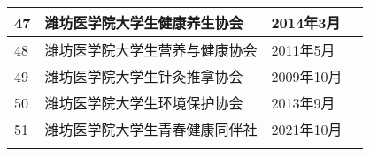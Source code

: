 \begin{center}
\begin{tabular}{|>{\centering\arraybackslash}p{2em}|>{\centering\arraybackslash}p{22em}|%
    >{\centering\arraybackslash}p{6em}|>{\centering\arraybackslash}p{5em}|}
        \cline{1-3}
        47 & 潍坊医学院大学生健康养生协会    & 2014年3月  &                        \\
        \cline{1-3}
        48 & 潍坊医学院大学生营养与健康协会   & 2011年5月  &                        \\
        \cline{1-3}
        49 & 潍坊医学院大学生针灸推拿协会    & 2009年10月 &                        \\
        \cline{1-3}
        50 & 潍坊医学院大学生环境保护协会    & 2013年9月  &                        \\
        \cline{1-3}
        51 & 潍坊医学院大学生青春健康同伴社   & 2021年10月 &                        \\
        \Xhline{1.2pt}
    \end{tabular}
\end{center}
